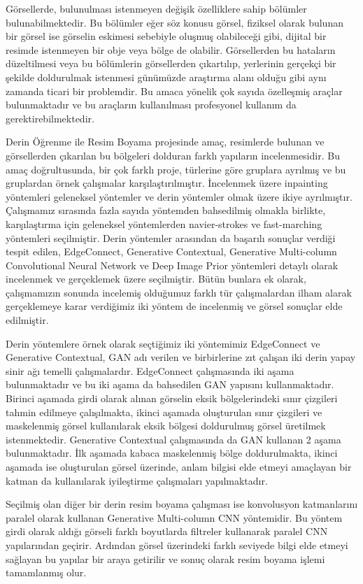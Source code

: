Görsellerde, bulunulması istenmeyen değişik özelliklere sahip bölümler bulunabilmektedir. Bu bölümler eğer söz konusu görsel, fiziksel olarak bulunan bir görsel ise görselin eskimesi sebebiyle oluşmuş olabileceği gibi, dijital bir resimde istenmeyen bir obje veya bölge de olabilir. Görsellerden bu hataların düzeltilmesi veya bu bölümlerin görsellerden çıkartılıp, yerlerinin gerçekçi bir şekilde doldurulmak istenmesi günümüzde araştırma alanı olduğu gibi aynı zamanda ticari bir problemdir. Bu amaca yönelik çok sayıda özelleşmiş araçlar bulunmaktadır ve bu araçların kullanılması profesyonel kullanım da gerektirebilmektedir.

Derin Öğrenme ile Resim Boyama projesinde amaç, resimlerde bulunan ve görsellerden çıkarılan bu bölgeleri dolduran farklı yapıların incelenmesidir. Bu amaç doğrultusunda, bir çok farklı proje, türlerine göre gruplara ayrılmış ve bu gruplardan örnek çalışmalar karşılaştırılmıştır. İncelenmek üzere inpainting yöntemleri geleneksel yöntemler ve derin yöntemler olmak üzere ikiye ayrılmıştır. Çalışmamız sırasında fazla sayıda yöntemden bahsedilmiş olmakla birlikte, karşılaştırma için geleneksel yöntemlerden navier-strokes ve fast-marching yöntemleri seçilmiştir. Derin yöntemler arasından da başarılı sonuçlar verdiği tespit edilen, EdgeConnect, Generative Contextual, Generative Multi-column Convolutional Neural Network ve Deep Image Prior yöntemleri detaylı olarak incelenmek ve gerçeklemek üzere seçilmiştir. Bütün bunlara ek olarak, çalışmamızın sonunda incelemiş olduğumuz farklı tür çalışmalardan ilham alarak gerçeklemeye karar verdiğimiz iki yöntem de incelenmiş ve görsel sonuçlar elde edilmiştir.

Derin yöntemlere örnek olarak seçtiğimiz iki yöntemimiz EdgeConnect ve Generative Contextual, GAN adı verilen ve birbirlerine zıt çalışan iki derin yapay sinir ağı temelli çalışmalardır. EdgeConnect çalışmasında iki aşama bulunmaktadır ve bu iki aşama da bahsedilen GAN yapısını kullanmaktadır. Birinci aşamada girdi olarak alınan görselin eksik bölgelerindeki sınır çizgileri tahmin edilmeye çalışılmakta, ikinci aşamada oluşturulan sınır çizgileri ve maskelenmiş görsel kullanılarak eksik bölgesi doldurulmuş görsel üretilmek istenmektedir. Generative Contextual çalışmasında da GAN kullanan 2 aşama bulunmaktadır. İlk aşamada kabaca maskelenmiş bölge doldurulmakta, ikinci aşamada ise oluşturulan görsel üzerinde, anlam bilgisi elde etmeyi amaçlayan bir katman da kullanılarak iyileştirme çalışmaları yapılmaktadır.

Seçilmiş olan diğer bir derin resim boyama çalışması ise konvolusyon katmanlarını paralel olarak kullanan Generative Multi-column CNN yöntemidir. Bu yöntem girdi olarak aldığı görseli farklı boyutlarda filtreler kullanarak paralel CNN yapılarından geçirir. Ardından görsel üzerindeki farklı seviyede bilgi elde etmeyi sağlayan bu yapılar bir araya getirilir ve sonuç olarak resim boyama işlemi tamamlanmış olur.

